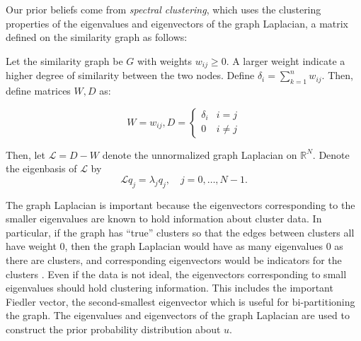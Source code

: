 \documentclass{siamart1116}
\begin{document}
Our prior beliefs come from \textit{spectral clustering}, which uses the clustering properties of the eigenvalues and eigenvectors of the graph Laplacian, a matrix defined on the similarity graph as follows:

Let the similarity graph be $G$ with weights $w_{ij} \ge 0$. A larger weight indicate a higher degree of similarity between the two nodes. Define $\delta_i = \sum_{k=1}^n w_{ij}$. Then, define matrices $W, D$ as:

\[W = w_{ij}, D = \begin{cases} 
\delta_i    & i = j \\
0           & i \neq j 
\end{cases}\]

Then, let $\mathcal{L} = D - W$ denote the unnormalized graph Laplacian on $\mathbb{R}^N$. Denote the eigenbasis of $\mathcal{L}$ by
\begin{equation}
\label{eqn:laplacian}
\mathcal{L}q_j = \lambda_j q_j,\quad j=0,\ldots,N-1.
\end{equation}

The graph Laplacian is important because the eigenvectors corresponding to the smaller eigenvalues are known to hold information about cluster data. In particular, if the graph has ``true'' clusters so that the edges between clusters all have weight 0, then the graph Laplacian would have as many eigenvalues 0 as there are clusters, and corresponding eigenvectors would be indicators for the clusters \cite{Spectral}. Even if the data is not ideal, the eigenvectors corresponding to small eigenvalues should hold clustering information. This includes the important Fiedler vector, the second-smallest eigenvector which is useful for bi-partitioning the graph. The eigenvalues and eigenvectors of the graph Laplacian are used to construct the prior probability distribution about $u$.

\end{document}
